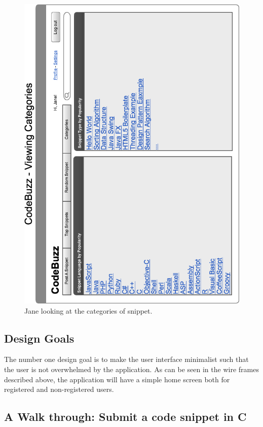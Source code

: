 \documentclass[11pt,a4paper]{article}
\begin{document}
\begin{figure}
\includegraphics[width=\textwidth]{../imgs/viewingCategoriesHorz.png}
\caption{Jane looking at the categories of snippet.}
\label{fig:viewCategories}
\end{figure}

\subsection{Design Goals}

The number one design goal is to make the user interface minimalist
such that the user is not overwhelmed by the application. As can be
seen in the wire frames described above, the application will have a simple
home screen both for registered and non-registered users.

\subsection{A Walk through: Submit a code snippet in C}
\end{document}
